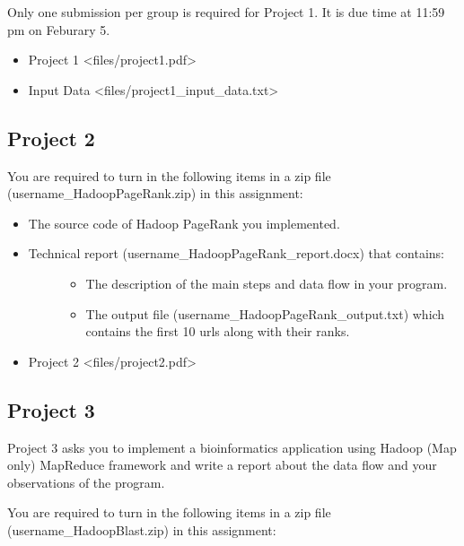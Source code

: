 Only one submission per group is required for Project 1. It is due time
at 11:59 pm on Feburary 5.

\begin{itemize}

\item
  Project 1 \textless{}files/project1.pdf\textgreater{}
\item
  Input Data \textless{}files/project1\_input\_data.txt\textgreater{}
\end{itemize}

\subsection{Project 2}\label{project-2}

You are required to turn in the following items in a zip file
(username\_HadoopPageRank.zip) in this assignment:

\begin{itemize}
\item
  The source code of Hadoop PageRank you implemented.
\item
  \begin{description}
  \item[Technical report (username\_HadoopPageRank\_report.docx) that
  contains:]
  \begin{itemize}

  \item
    The description of the main steps and data flow in your program.
  \item
    The output file (username\_HadoopPageRank\_output.txt) which
    contains the first 10 urls along with their ranks.
  \end{itemize}
  \end{description}
\item
  Project 2 \textless{}files/project2.pdf\textgreater{}
\end{itemize}

\subsection{Project 3}\label{project-3}

Project 3 asks you to implement a bioinformatics application using
Hadoop (Map only) MapReduce framework and write a report about the data
flow and your observations of the program.

You are required to turn in the following items in a zip file
(username\_HadoopBlast.zip) in this assignment:

